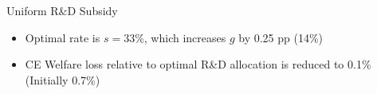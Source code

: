 \documentclass[
  10pt, %
  aspectratio=169,  %
  handout
]{beamer}
\theoremstyle{plain}
\begin{document}
\begin{frame}{Uniform R\&D Subsidy \hyperlink{optimal}{}}
  \begin{center}
    \begin{figure}
      \centering{}\setcounter{subfigure}{0}
    \end{figure}
    \par\end{center}
  \begin{itemize}
    \item Optimal rate is $s=$33\%, which increases $g$ by 0.25 pp (14\%)
    \item CE Welfare loss relative to optimal R\&D allocation is reduced to
          0.1\% (Initially 0.7\%)
  \end{itemize}
\end{frame}
%
\end{document}
